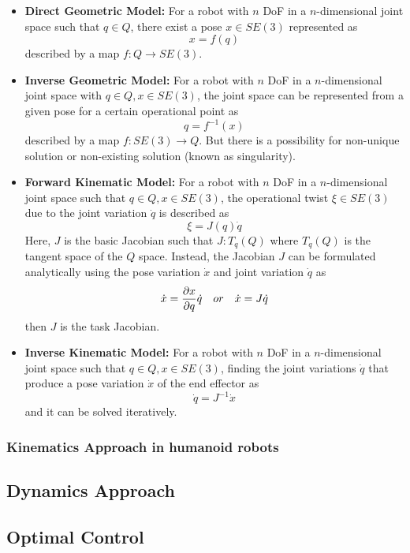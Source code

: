 \begin{itemize}
    \item \textbf{Direct Geometric Model:} For a robot with $n$ DoF in a $n$-dimensional joint space such that $q \in Q$, there exist a pose $x \in \mathit{SE(3)}$ represented as
    $$x = f(q)$$ described by a map $f:Q \rightarrow \mathit{SE(3)}$.
    
    \item \textbf{Inverse Geometric Model:} For a robot with $n$ DoF in a $n$-dimensional joint space with $q \in Q, x \in \mathit{SE(3)}$, the joint space can be represented from 
    a given pose for a certain operational point as $$q = f^{-1}(x)$$ described by a map $f: \mathit{SE(3) \rightarrow Q}$. But there is a possibility for non-unique solution or 
    non-existing solution (known as singularity).

    \item \textbf{Forward Kinematic Model:} For a robot with $n$ DoF in a $n$-dimensional joint space such that $q \in Q, x \in \mathit{SE(3)}$, the operational twist $\xi \in
     \mathit{SE(3)}$ due to the joint variation $\dot{q}$ is described as $$\xi = J(q)\dot{q}$$ Here, $J$ is the basic Jacobian such that $J : T_q(Q)$ where $T_q(Q)$ is the tangent 
     space of the $Q$ space. Instead, the Jacobian $J$ can be formulated analytically using the pose variation $\dot{x}$ and joint variation $\dot{q}$ as $$\dot{x} = \frac{\partial x}{\partial 
     q}\dot{q} \quad \mathnormal{or} \quad \dot{x} = J\dot{q}$$ then $J$ is the task Jacobian.

     \item \textbf{Inverse Kinematic Model:} For a robot with $n$ DoF in a $n$-dimensional joint space such that $q \in Q, x \in \mathit{SE(3)}$, finding the joint variations $\dot{q}$
     that produce a pose variation $\dot{x}$ of the end effector as $$\dot{q} = J^{-1} \dot{x}$$ and it can be solved iteratively.
\end{itemize}

\subsubsection{Kinematics Approach in humanoid robots}


\subsection{Dynamics Approach}
\subsection{Optimal Control}

